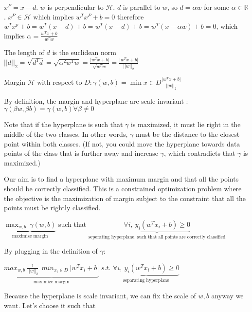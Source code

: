 \documentclass[12pt]{article}
\begin{document}
 $x^{P} = x - d.$
 $w$ is perpendicular to $\mathcal{H}$. $d$ is parallel to $w$,  so $d = \alpha w$ for some $\alpha \in \mathbb{R}$. $x^{P} \in \mathcal{H}$ which implies $w^{T}x^{P} + b =0$
 therefore\\  $w^{T}x^{p} + b = w^{T}(x-d) + b = w^{T}(x-d) + b = w^{T}(x-\alpha w) + b =0$, which implies $\alpha = \frac{w^{T}x + b}{w^{T}w}$
 
 The length of $d$ is the euclidean norm \\$\vert \vert d \vert \vert_{2} = \sqrt{d^{T}d} = \sqrt{\alpha ^{2}w^{T}w} = \frac{\vert w^{T}x +b \vert}{\sqrt{w^{T}w}} = \frac{\vert w^{T}x + b \vert}{\vert \vert w \vert \vert_{2}}$
 
 Margin $\mathcal{H}$ with respect to $D:\gamma(w,b) = \min{x \in D} \frac{\vert w^{T}x + b \vert }  {\vert \vert w \vert \vert_{2}}$
 
 By definition, the margin and hyperplane are scale invariant : $\gamma(\beta w,\beta b) = \gamma (w,b) \forall \beta \neq 0$
 
 
 Note that if the hyperplane is such that $\gamma$ is maximized, it must lie right in the middle of the two classes. In other words, $\gamma$ must be the distance to the closest point within both classes. (If not, you could move the hyperplane towards data points of the class that is further away and increase $\gamma$, which contradicts that $\gamma$ is maximized.)
 
 
 
 
 Our aim is to find a hyperplane with maximum margin and  that all the points should be  correctly classified. This is a constrained optimization problem where the objective is the maximization of margin subject to the constraint that all the points must  be rightly classified.
 
 $\underbrace{\max_{w,b}  \ \gamma(w,b)}_\text{maximize margin}$ such that $\underbrace{ \forall i, \ y_{i}(w^{T}x_{i} + b) \geq 0}_\text{seperating hyperplane, such that all points are correctly classified}$
 
 
 By plugging in the definition of $\gamma$:
 
 $ \underbrace{max_{w,b} \  \frac{1} {\vert \vert w \vert \vert_{2} } \ \ min _{x_{i} \in D} \  \vert w^{T}x_{i} + b \vert }_\text{maximize margin}$ $s.t.$  $\underbrace{\forall i, \  y_{i}(w^{T}x_{i} + b) \geq 0}_\text{separating hyperplane}$ 
 
 
 Because the hyperplane is scale invariant, we can fix the scale of $w,b$ anyway we want. Let's  choose it such that 
 
\end{document}
